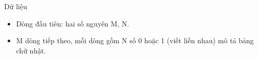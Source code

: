Dữ liệu
\begin{itemize}
	\item     Dòng đầu tiên: hai số nguyên M, N.   
	\item     M dòng tiếp theo, mỗi dòng gồm N số 0 hoặc 1 (viết liền nhau) mô tả bảng chữ nhật.    


\end{itemize}